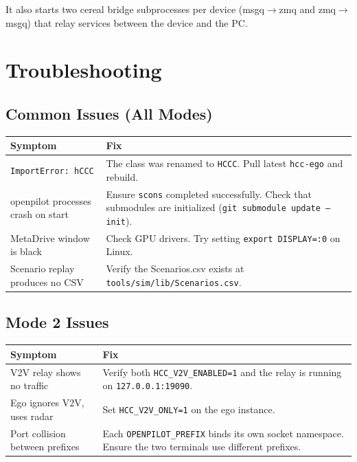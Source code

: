 \documentclass[11pt, letterpaper]{article}
\begin{document}
It also starts two cereal bridge subprocesses per device (msgq$\to$zmq
and zmq$\to$msgq) that relay services between the device and the PC.


\section{Troubleshooting}
\label{sec:troubleshooting}

\subsection{Common Issues (All Modes)}

\begin{center}
\begin{tabular}{@{}p{5cm}p{9cm}@{}}
\toprule
\textbf{Symptom} & \textbf{Fix} \\
\midrule
\texttt{ImportError: hCCC} &
  The class was renamed to \texttt{HCCC}. Pull latest
  \texttt{hcc-ego} and rebuild. \\
openpilot processes crash on start &
  Ensure \texttt{scons} completed successfully. Check that
  submodules are initialized (\texttt{git submodule update --init}). \\
MetaDrive window is black &
  Check GPU drivers. Try setting
  \texttt{export DISPLAY=:0} on Linux. \\
Scenario replay produces no CSV &
  Verify the Scenarios.csv exists at
  \texttt{tools/sim/lib/Scenarios.csv}. \\
\bottomrule
\end{tabular}
\end{center}

\subsection{Mode 2 Issues}

\begin{center}
\begin{tabular}{@{}p{5cm}p{9cm}@{}}
\toprule
\textbf{Symptom} & \textbf{Fix} \\
\midrule
V2V relay shows no traffic &
  Verify both \texttt{HCC\_V2V\_ENABLED=1} and the relay is running on
  \texttt{127.0.0.1:19090}. \\
Ego ignores V2V, uses radar &
  Set \texttt{HCC\_V2V\_ONLY=1} on the ego instance. \\
Port collision between prefixes &
  Each \texttt{OPENPILOT\_PREFIX} binds its own socket namespace.
  Ensure the two terminals use different prefixes. \\
\bottomrule
\end{tabular}
\end{center}
\end{document}
